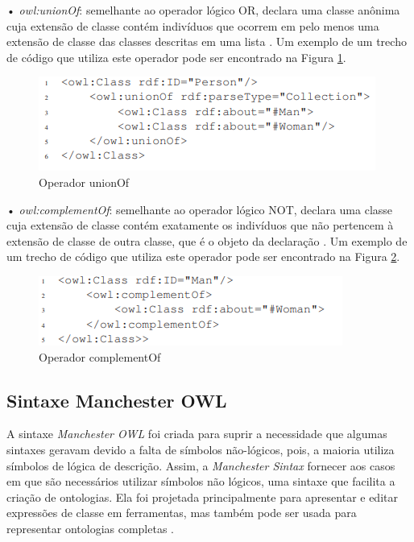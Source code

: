\documentclass{bcc}
\begin{document}
• \textit{owl:unionOf}: semelhante ao operador lógico OR, declara uma classe anônima cuja extensão de classe contém indivíduos que ocorrem em pelo menos uma extensão de classe das classes descritas em uma lista \cite{bechhofer2004}. Um exemplo de um trecho de código que utiliza este operador pode ser encontrado na Figura \ref{fig:opor}.

\begin{figure}[H]
\centering
\includegraphics[width=.9\textwidth]{Figuras/op_or.PNG}
\caption{Operador unionOf}
\label{fig:opor}
\end{figure}


• \textit{owl:complementOf}: semelhante ao operador lógico NOT,  declara uma classe cuja extensão de classe contém exatamente os indivíduos que não pertencem à extensão de classe de outra classe, que é o objeto da declaração \cite{bechhofer2004}. Um exemplo de um trecho de código que utiliza este operador pode ser encontrado na Figura \ref{fig:opnot}.

\begin{figure}[H]
\centering
\includegraphics[width=.9\textwidth]{Figuras/op_not.PNG}
\caption{Operador complementOf}
\label{fig:opnot}
\end{figure}


\subsection{Sintaxe Manchester OWL}

A sintaxe \textit{Manchester OWL} \cite{horridge2006} foi criada para suprir a necessidade que algumas sintaxes geravam devido a falta de símbolos não-lógicos, pois, a maioria utiliza símbolos de lógica de descrição. Assim, a \textit{Manchester Sintax} fornecer aos casos em que são necessários utilizar símbolos não lógicos, uma sintaxe que facilita a criação de ontologias. Ela foi projetada principalmente para apresentar e editar expressões de classe em ferramentas, mas também pode ser usada para representar ontologias completas \cite{horridge2006}.
\end{document}
